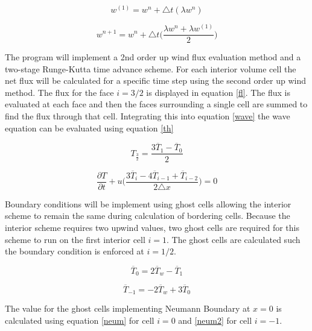 \documentclass[paper=a4, fontsize=11pt, abstract=on]{scrartcl}
\numberwithin{equation}{section}		%
\numberwithin{figure}{section}			%
\numberwithin{table}{section}				%
\begin{document}
 \begin{equation}
\label{rung1}
w^{(1)}=w^n+\triangle t(\lambda w^n)
\end{equation} 


 \begin{equation}
\label{rung2}
w^{n+1}=w^n+\triangle t\Bigg(\frac{\lambda w^n+\lambda w^{(1)}}{2}\Bigg)
\end{equation}

 The program will implement a 2nd order up wind flux evaluation method and a two-stage Runge-Kutta time advance scheme. For each interior volume cell the net flux will be calculated for a specific time step using the second order up wind method. The flux for the face $i=3/2$ is displayed in equation \ref{fl}. The flux is evaluated at each face and then the faces surrounding a single cell are summed to find the flux through that cell. Integrating this into equation \ref{wave} the wave equation can be evaluated using equation \ref{th}

 \begin{equation}
\label{fl}
T_{\frac{3}{2}}=\frac{3\overline{T}_{1}-\overline{T}_{0}}{2} 
\end{equation}

 \begin{equation}
\label{th}
\frac{\partial T}{\partial t} + u\Bigg(\frac{3\overline{T}_{i}-4\overline{T}_{i-1}+\overline{T}_{i-2}}{2\triangle x}\Bigg)  = 0
\end{equation}

Boundary conditions will be implement using ghost cells allowing the interior scheme to remain the same during calculation of bordering cells. Because the interior scheme requires two upwind values, two ghost cells are required for this scheme to run on the first interior cell $i=1$. The ghost cells are calculated such the boundary condition is enforced at $i=1/2$. 



\begin{equation}
\label{neum}
\overline{T}_{0} = 2\overline{T}_{w}-\overline{T}_{1} 
\end{equation} 

\begin{equation}
\label{neum2}
\overline{T}_{-1} = -2\overline{T}_{w}+3\overline{T}_{0} 
\end{equation} 


The value for the ghost cells implementing Neumann Boundary at $x=0$ is calculated using equation \ref{neum} for cell $i = 0$ and \ref{neum2} for cell $i = -1$.
 
\end{document}
